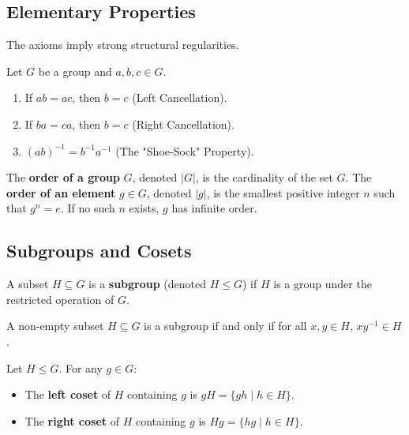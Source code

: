 \documentclass[oneside]{book}
\begin{document}
\subsection{Elementary Properties}

The axioms imply strong structural regularities.

\begin{proposition}
Let $G$ be a group and $a, b, c \in G$.
\begin{enumerate}
    \item If $ab = ac$, then $b=c$ (Left Cancellation).
    \item If $ba = ca$, then $b=c$ (Right Cancellation).
    \item $(ab)^{-1} = b^{-1}a^{-1}$ (The "Shoe-Sock" Property).
\end{enumerate}
\end{proposition}

\begin{definition}[Order]
The \textbf{order of a group} $G$, denoted $|G|$, is the cardinality of the set $G$. The \textbf{order of an element} $g \in G$, denoted $|g|$, is the smallest positive integer $n$ such that $g^n = e$. If no such $n$ exists, $g$ has infinite order.
\end{definition}

\subsection{Subgroups and Cosets}

\begin{definition}[Subgroup]
A subset $H \subseteq G$ is a \textbf{subgroup} (denoted $H \leq G$) if $H$ is a group under the restricted operation of $G$.
\end{definition}

\begin{lemma}
A non-empty subset $H \subseteq G$ is a subgroup if and only if for all $x, y \in H$, $xy^{-1} \in H$.
\end{lemma}

\begin{definition}[Cosets]
Let $H \leq G$. For any $g \in G$:
\begin{itemize}
    \item The \textbf{left coset} of $H$ containing $g$ is $gH = \{gh \mid h \in H\}$.
    \item The \textbf{right coset} of $H$ containing $g$ is $Hg = \{hg \mid h \in H\}$.
\end{itemize}
\end{definition}
\end{document}
